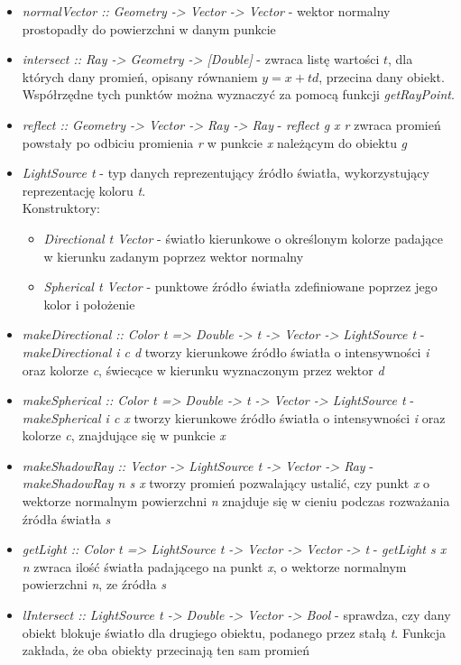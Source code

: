 \documentclass[11pt,a4paper]{article}
\begin{document}
\begin{itemize}
\item\textit{normalVector :: Geometry -> Vector -> Vector} - wektor normalny prostopadły do powierzchni w danym punkcie
\item\textit{intersect :: Ray -> Geometry -> [Double]} - zwraca listę wartości $t$, dla których dany promień, opisany równaniem $y = x+td$, przecina dany obiekt. Współrzędne tych punktów można wyznaczyć za pomocą funkcji \textit{getRayPoint}.
\item\textit{reflect :: Geometry -> Vector -> Ray -> Ray} - \textit{reflect g x r} zwraca promień powstały po odbiciu promienia \textit{r} w punkcie \textit{x} należącym do obiektu \textit{g}
\item\textit{LightSource t} - typ danych reprezentujący źródło światła, wykorzystujący reprezentację koloru \textit{t}.\\Konstruktory:
\begin{itemize}
\item\textit{Directional t Vector} - światło kierunkowe o określonym kolorze padające w kierunku zadanym poprzez wektor normalny
\item\textit{Spherical t Vector} - punktowe źródło światła zdefiniowane poprzez jego kolor i położenie
\end{itemize}
\item\textit{makeDirectional :: Color t => Double -> t -> Vector -> LightSource t} - \textit{makeDirectional i c d} tworzy kierunkowe źródło światła o intensywności \textit{i} oraz kolorze \textit{c}, świecące w kierunku wyznaczonym przez wektor \textit{d}
\item\textit{makeSpherical :: Color t => Double -> t -> Vector -> LightSource t} - \textit{makeSpherical i c x} tworzy kierunkowe źródło światła o intensywności \textit{i} oraz kolorze \textit{c}, znajdujące się w punkcie \textit{x}
\item\textit{makeShadowRay :: Vector -> LightSource t -> Vector -> Ray} - \textit{makeShadowRay n s x} tworzy promień pozwalający ustalić, czy punkt \textit{x} o wektorze normalnym powierzchni \textit{n} znajduje się w cieniu podczas rozważania źródła światła \textit{s}
\item\textit{getLight :: Color t => LightSource t -> Vector -> Vector -> t} - \textit{getLight s x n} zwraca ilość światła padającego na punkt \textit{x}, o wektorze normalnym powierzchni \textit{n}, ze źródła \textit{s}
\item\textit{lIntersect :: LightSource t -> Double -> Vector -> Bool} - sprawdza, czy dany obiekt blokuje światło dla drugiego obiektu, podanego przez stałą \textit{t}. Funkcja zakłada, że oba obiekty przecinają ten sam promień
\end{itemize}
\end{document}

